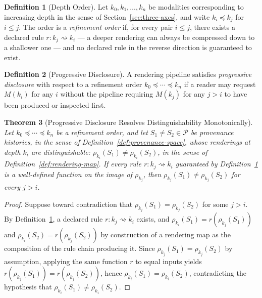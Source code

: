 \documentclass[11pt]{article}
\newtheorem{theorem}{Theorem}[section]
\theoremstyle{definition}
\newtheorem{definition}[theorem]{Definition}
\begin{document}
\begin{definition}[Depth Order]
\label{def:depth-order}
Let $k_0, k_1, \dots, k_n$ be modalities corresponding to increasing depth in the sense of Section~\ref{sec:three-axes}, and write $k_i \preceq k_j$ for $i \leq j$. The order is a \emph{refinement order} if, for every pair $i \leq j$, there exists a declared rule $r : k_j \rightsquigarrow k_i$ --- a deeper rendering can always be compressed down to a shallower one --- and no declared rule in the reverse direction is guaranteed to exist.
\end{definition}

\begin{definition}[Progressive Disclosure]
\label{def:progressive-disclosure}
A rendering pipeline satisfies \emph{progressive disclosure} with respect to a refinement order $k_0 \preceq \cdots \preceq k_n$ if a reader may request $M(k_i)$ for any $i$ without the pipeline requiring $M(k_j)$ for any $j > i$ to have been produced or inspected first.
\end{definition}

\begin{theorem}[Progressive Disclosure Resolves Distinguishability Monotonically]
\label{thm:progressive-disclosure}
Let $k_0 \preceq \cdots \preceq k_n$ be a refinement order, and let $S_1 \neq S_2 \in \mathcal{P}$ be provenance histories, in the sense of Definition~\ref{def:provenance-space}, whose renderings at depth $k_i$ are distinguishable: $\rho_{k_i}(S_1) \neq \rho_{k_i}(S_2)$, in the sense of Definition~\ref{def:rendering-map}. If every rule $r : k_j \rightsquigarrow k_i$ guaranteed by Definition~\ref{def:depth-order} is a well-defined function on the image of $\rho_{k_j}$, then $\rho_{k_j}(S_1) \neq \rho_{k_j}(S_2)$ for every $j > i$.
\end{theorem}

\begin{proof}
Suppose toward contradiction that $\rho_{k_j}(S_1) = \rho_{k_j}(S_2)$ for some $j > i$. By Definition~\ref{def:depth-order}, a declared rule $r : k_j \rightsquigarrow k_i$ exists, and $\rho_{k_i}(S_1) = r(\rho_{k_j}(S_1))$ and $\rho_{k_i}(S_2) = r(\rho_{k_j}(S_2))$ by construction of a rendering map as the composition of the rule chain producing it. Since $\rho_{k_j}(S_1) = \rho_{k_j}(S_2)$ by assumption, applying the same function $r$ to equal inputs yields $r(\rho_{k_j}(S_1)) = r(\rho_{k_j}(S_2))$, hence $\rho_{k_i}(S_1) = \rho_{k_i}(S_2)$, contradicting the hypothesis that $\rho_{k_i}(S_1) \neq \rho_{k_i}(S_2)$.
\end{proof}
\end{document}

